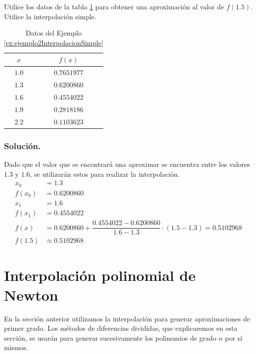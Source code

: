 \begin{exerciseT}
Utilice los datos de la tabla \ref{table:ejemplo2InterpolacionSimple} para obtener una aproximación al valor de $f(1.5)$. 
Utilice la interpolación simple.
	
	\begin{table}[H]
		\centering
      	\begin{tabular}{cc}
			\toprule
			$x$ & $f(x)$\\
			\midrule
			$1.0$ & $0.7651977$ \\
			$1.3$ & $0.6200860$ \\
			$1.6$ & $0.4554022$ \\
			$1.9$ & $0.2818186$ \\
			$2.2$ & $0.1103623$ \\
			\bottomrule
      	\end{tabular}
      	\caption{Datos del Ejemplo \ref{ex:ejemplo2InterpolacionSimple}}
      	\label{table:ejemplo2InterpolacionSimple}
	\end{table}	
	
	\subsubsection*{Solución.} 
	Dado que el valor que se encontrará una aproximar se encuentra entre los valores $1.3$ y $1.6$, se utilizarán estos para realizar 
	la interpolación.
	\begin{align*}
		x_0 &= 1.3 \\
		f(x_0) &= 0.6200860\\
		x_1 &= 1.6 \\
		f(x_1) &= 0.4554022 \\
		f(x) &= 0.6200860 + \dfrac{0.4554022-0.6200860}{1.6-1.3}\cdot (1.5-1.3) = 0.5102968\\
		f(1.5) &\approx 0.5102968
	\end{align*}
	
	\label{ex:ejemplo2InterpolacionSimple}
\end{exerciseT}

\section{Interpolación polinomial de Newton}
En la sección anterior utilizamos la interpolación para generar aproximaciones de primer grado. Los métodos de diferencias 
divididas, que explicaremos en esta sección, se usarán para generar sucesivamente los polinomios de grado $n$ por sí mismos.

